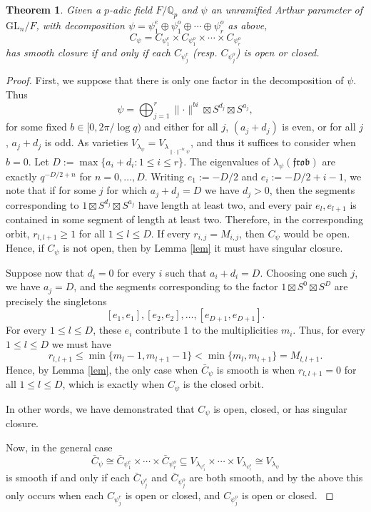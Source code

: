 \documentclass[12pt]{amsart}
\newcommand\norm[1]{\lVert#1\rVert}
\theoremstyle{plain}
\newtheorem{theorem}{Theorem}%
\theoremstyle{definition}
\newcommand{\mf}{\mathfrak}
\newcommand{\bq}{\mathbb{Q}}
\newcommand{\1}{\mathbbm{1}}
\newcommand{\GL}{\mathrm{GL}}
\begin{document}
	
	\begin{theorem}\label{thm}
		Given a $p$-adic field $F/\bq_p$ and $\psi$ an unramified Arthur parameter of $\GL_n/F$, with decomposition $\psi=\psi_1^e\oplus \psi_1^o\oplus \cdots \oplus \psi_r^o$ as above,
		 $$C_\psi=C_{\psi_1^e}\times C_{\psi_1^o}\times \cdots \times C_{\psi_r^o}$$
		  has smooth closure if and only if each $C_{\psi_j^e}$ (resp. $C_{\psi_j^o}$) is open or closed. 
	\end{theorem}  
	{\allowdisplaybreaks
	\begin{proof}
		First, we suppose that there is only one factor in the decomposition of $\psi$.  
		Thus
		$$\psi=\bigoplus_{j=1}^r\norm{\cdot}^{bi}\boxtimes S^{d_j}\boxtimes S^{a_j},$$
		for some fixed $b\in[0, 2\pi/\log q)$ and either  for all $j$, $(a_j+d_j)$ is even, or for all $j$, $a_j+d_j$ is odd.   
		As varieties $V_{\lambda_\psi}=V_{\lambda_{\norm{\cdot}^{-bi}\psi}}$, and thus it suffices to consider when $b=0$.  
		Let $D:=\max\{a_i+d_i : 1\leq i \leq r\}$.
		The eigenvalues of $\lambda_\psi(\mf{frob})$ are exactly $q^{-D/2 +n}$ for $n=0, \ldots, D$.  
		Writing $e_1:=-D/2$ and $e_i:=-D/2 +i-1$, we note that if for some $j$ for which $a_j+d_j=D$ we have $d_j>0$, then the segments corresponding to $1\boxtimes S^{d_j}\boxtimes S^{a_j}$ have length at least two, and every pair $e_l, e_{l+1}$ is contained in some segment of length at least two.   
		Therefore, in the corresponding orbit, $r_{l, l+1}\geq 1$ for all $1\leq l \leq  D$.  
		If every $r_{i,j}=M_{i,j}$, then $C_\psi$ would be open.  
		Hence, if $C_\psi$ is not open, then by Lemma \ref{lem} it must have singular closure. 
		
		
		Suppose now that $
		d_i=0$ for every $i$ such that $a_i+d_i=D$.
		Choosing one such $j$, we have $a_j=D$, and the segments corresponding
		to the factor $
		1\boxtimes S^0\boxtimes S^D$
		are precisely the singletons
		\[
		[e_1, e_1],[e_2, e_2],\ldots,[e_{D+1}, e_{D+1}].
		\]
		For every $1\leq l\leq D$, these $e_i$ contribute 1 to the multiplicities $m_i$.  
		Thus, for every $1\leq l \leq D$ we must have
		 $$r_{l, l+1}\leq \min\{m_l-1, m_{l+1}-1\}<\min\{m_l, m_{l+1}\}=M_{l, l+1}.$$
		Hence, by Lemma \ref{lem}, the only case when $\bar{C}_\psi$ is smooth is when $r_{l, l+1}=0$ for all $1\leq l \leq D$, which is exactly when $C_\psi$ is the closed orbit.   
		
		In other words, we have demonstrated that $C_\psi$ is open, closed, or has singular closure.  
		
		{\allowdisplaybreaks
		Now, in the general case
		$$\bar{C}_\psi\cong \bar{C}_{\psi_1^e}\times\cdots \times  \bar{C}_{\psi_r^o}\subseteq V_{\lambda_{\psi_1^e}}\times\cdots \times  V_{\lambda_{\psi_r^o}}\cong V_{\lambda_\psi}$$
		is smooth if and only if each $\bar{C}_{\psi_j^e}$ and $\bar{C}_{\psi_j^o}$ are both smooth, and by the above this only occurs when each $C_{\psi_j^e}$ is open or closed, and $C_{\psi_j^o}$ is open or closed. 
	}
	\end{proof}
}
	
\end{document}
